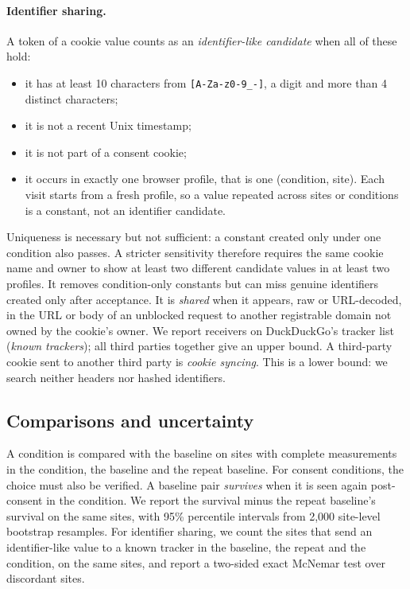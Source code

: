 \documentclass[sigconf,review,anonymous]{acmart}
\begin{document}
\paragraph{Identifier sharing.} A token of a cookie value counts as an \emph{identifier-like candidate} when all
of these hold:
\begin{itemize}
\item it has at least 10 characters from \texttt{[A-Za-z0-9\_-]}, a digit and more than 4
  distinct characters;
\item it is not a recent Unix timestamp;
\item it is not part of a consent cookie;
\item it occurs in exactly one browser profile, that is one (condition, site). Each visit starts
  from a fresh profile, so a value repeated across sites or conditions is a constant, not an
  identifier candidate.
\end{itemize}
Uniqueness is necessary but not sufficient: a constant created only under one condition also
passes. A stricter sensitivity therefore requires the same cookie name and owner to show at least
two different candidate values in at least two profiles. It removes condition-only constants but
can miss genuine identifiers created only after acceptance.
It is \emph{shared} when it appears, raw or URL-decoded, in the URL or body of an unblocked
request to another registrable domain not owned by the cookie's owner. We report receivers on
DuckDuckGo's tracker list (\emph{known trackers}); all third parties together give an upper
bound. A third-party cookie sent to another third party is \emph{cookie syncing}. This is a lower
bound: we search neither headers nor hashed identifiers.

\subsection{Comparisons and uncertainty}
A condition is compared with the baseline on sites with complete measurements in the condition,
the baseline and the repeat baseline. For consent conditions, the choice must also be verified.
A baseline pair \emph{survives} when it is seen again post-consent in the condition. We report
the survival minus the repeat baseline's survival on the same sites, with 95\% percentile
intervals from 2,000 site-level bootstrap resamples. For identifier sharing, we count the sites
that send an identifier-like value to a known tracker in the baseline, the repeat and the
condition, on the same sites, and report a two-sided exact McNemar test over discordant sites.
\end{document}
